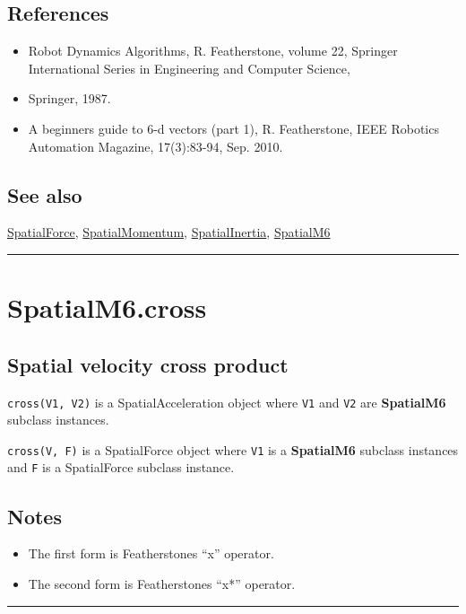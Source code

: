\subsection*{References}
\begin{itemize}
  \item Robot Dynamics Algorithms, R. Featherstone, volume 22,     Springer International Series in Engineering and Computer Science,
  \item Springer, 1987.
  \item A beginner\textquotesingle s guide to 6-d vectors (part 1), R. Featherstone,     IEEE Robotics Automation Magazine, 17(3):83-94, Sep. 2010.
\end{itemize}

\subsection*{See also}


\hyperlink{SpatialForce}{\color{blue} SpatialForce}, \hyperlink{SpatialMomentum}{\color{blue} SpatialMomentum}, \hyperlink{SpatialInertia}{\color{blue} SpatialInertia}, \hyperlink{SpatialM6}{\color{blue} SpatialM6}

\vspace{1.5ex}\hrule

\hypertarget{SpatialM6.cross}{\section*{SpatialM6.cross}}
\subsection*{Spatial velocity cross product}


\texttt{cross(V1, V2)} is a SpatialAcceleration object where \texttt{V1} and \texttt{V2} are \textbf{\color{red} SpatialM6}
subclass instances.



\texttt{cross(V, F)} is a SpatialForce object where \texttt{V1} is a \textbf{\color{red} SpatialM6}
subclass instances and \texttt{F} is a SpatialForce subclass instance.


\subsection*{Notes}
\begin{itemize}
  \item The first form is Featherstone\textquotesingle s ``x'' operator.
  \item The second form is Featherstone\textquotesingle s ``x*'' operator.
\end{itemize}
\vspace{1.5ex}\rule{\textwidth}{1mm}

